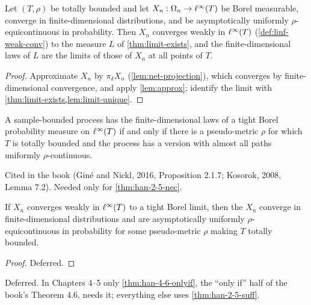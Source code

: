 \begin{theorem}
  \label{thm:han-2-5-suff}
  Let $(T,\rho)$ be totally bounded and let $X_n:\Omega_n\to\ell^\infty(T)$ be Borel measurable, converge in finite-dimensional distributions, and be asymptotically uniformly $\rho$-equicontinuous in probability. Then $X_n$ converges weakly in $\ell^\infty(T)$ (\cref{def:linf-weak-conv}) to the measure $L$ of \cref{thm:limit-exists}, and the finite-dimensional laws of $L$ are the limits of those of $X_n$ at all points of $T$.
\end{theorem}
\begin{proof}
  Approximate $X_n$ by $\pi_\delta X_n$ (\cref{lem:net-projection}), which converges by finite-dimensional convergence, and apply \cref{lem:approx}; identify the limit with \cref{thm:limit-exists,lem:limit-unique}.
\end{proof}

\begin{proposition}
  \label{prop:han-2-3}
  A sample-bounded process has the finite-dimensional laws of a tight Borel probability measure on $\ell^\infty(T)$ if and only if there is a pseudo-metric $\rho$ for which $T$ is totally bounded and the process has a version with almost all paths uniformly $\rho$-continuous.
\end{proposition}
\begin{remark}
  Cited in the book (Gin\'e and Nickl, 2016, Proposition 2.1.7; Kosorok, 2008, Lemma 7.2). Needed only for \cref{thm:han-2-5-nec}.
\end{remark}

\begin{theorem}
  \label{thm:han-2-5-nec}
  \notready
  If $X_n$ converges weakly in $\ell^\infty(T)$ to a tight Borel limit, then the $X_n$ converge in finite-dimensional distributions and are asymptotically uniformly $\rho$-equicontinuous in probability for some pseudo-metric $\rho$ making $T$ totally bounded.
\end{theorem}
\begin{proof}
  Deferred.
\end{proof}
\begin{remark}
  Deferred. In Chapters 4--5 only \cref{thm:han-4-6-onlyif}, the ``only if'' half of the book's Theorem 4.6, needs it; everything else uses \cref{thm:han-2-5-suff}.
\end{remark}
